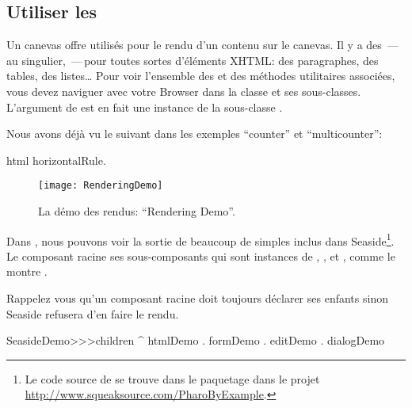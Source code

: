 \documentclass[a4paper,10pt,twoside]{book}
\begin{document}
\subsection{Utiliser les \brushes}
\seeindex{\brushes}{\brush}
Un canevas offre  utilisés pour le rendu d'un contenu sur le canevas.
Il y a des \brushes\,---\,au singulier, \brush\,---\,pour toutes
sortes d'éléments XHTML: des paragraphes, des tables, des listes\ldots
Pour voir l'ensemble des \brushes et des méthodes utilitaires
associées, vous devez naviguer avec votre Browser dans la classe
 et ses sous-classes. 
L'argument de  est en fait une instance de la
sous-classe .

Nous avons déjà vu le \brush suivant dans les exemples ``counter'' et ``multicounter'':
\begin{code}{}
html horizontalRule.
\end{code}

\begin{figure}[ht]
\begin{center}
\texttt{[image: RenderingDemo]}
\caption{La démo des rendus: ``Rendering Demo''.}
\end{center}
\end{figure}

Dans , nous pouvons voir la sortie de beaucoup
de \brushes simples inclus dans Seaside\footnote{Le code source de
   se trouve dans le paquetage 
  dans le projet
  \url{http://www.squeaksource.com/PharoByExample}.
  }.
Le composant racine   ses sous-composants qui sont instances de
, , 
et , comme le montre .

\needspace{7ex}

\noindent
Rappelez vous qu'un composant racine doit toujours déclarer ses
enfants sinon Seaside refusera d'en faire le rendu.
\begin{code}{}
SeasideDemo>>>children
	^ { htmlDemo . formDemo . editDemo . dialogDemo }
\end{code}
\end{document}
